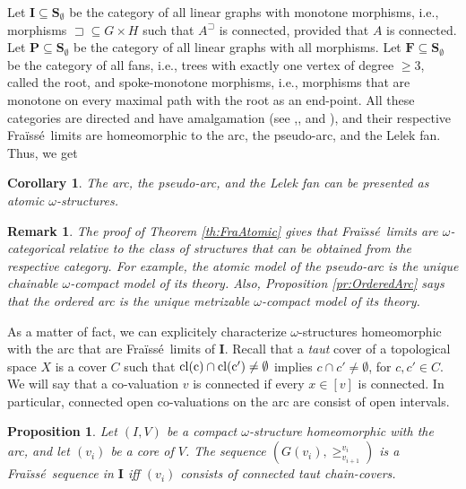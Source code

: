 \documentclass[12pt]{amsart}
\theoremstyle{plain}
\newtheorem{corollary}[theorem]{\bf Corollary}
\newtheorem{remark}[theorem]{\bf Remark}
\newtheorem{proposition}[theorem]{\bf Proposition}
\newcommand \sqsp{\sqsupset}
\newcommand {\cl}[1]{{\rm{cl}(#1)}}
\newcommand \fra{Fra\"{i}ss\'{e}}
\newcommand \FFf{\mathbf{F}}
\newcommand \IIf{\mathbf{I}}
\newcommand \PPf{\mathbf{P}}
\newcommand \SSf{\mathbf{S}}
\begin{document}
Let $\IIf \subseteq \SSf_\emptyset$ be the category of all linear  graphs with monotone morphisms, i.e., morphisms $\sqsp \subseteq G \times H$ such that $A^\sqsp$ is connected, provided that $A$ is connected. Let $\PPf \subseteq \SSf_\emptyset$ be the category of all linear graphs with all morphisms. Let $\FFf \subseteq \SSf_\emptyset$ be the category of all fans, i.e., trees with exactly one vertex of degree $\geq 3$, called the root, and spoke-monotone morphisms, i.e., morphisms that are monotone on every maximal path with the root as an end-point.  All these categories are directed and have amalgamation (see \cite[Proposition 5.13]{BaBiVi2},\cite[Theorem 4.14]{BiMa}, and  \cite[Proposition 5.29]{BaBiVi2}), and their respective \fra \  limits are homeomorphic to the arc, the pseudo-arc, and the Lelek fan. Thus, we get
 
\begin{corollary}
The arc, the pseudo-arc, and the Lelek fan can be presented as atomic $\omega$-structures.
\end{corollary}

\begin{remark}
The proof of Theorem \ref{th:FraAtomic} gives that \fra \ limits are $\omega$-categorical relative to the class of structures that can be obtained from the respective category. For example, the atomic model of the pseudo-arc is the unique chainable $\omega$-compact model of its theory. Also, Proposition \ref{pr:OrderedArc} says that the ordered arc is the unique metrizable $\omega$-compact model of its theory.
\end{remark}

As a matter of fact, we can explicitely characterize $\omega$-structures homeomorphic with the arc that are  \fra \  limits of $\IIf$.  Recall that a \emph{taut} cover of a topological space $X$ is a cover $C$ such that  $\cl{c} \cap \cl{c'} \neq \emptyset$ implies $c \cap c' \neq \emptyset$, for $c,c' \in C$. We will say that a co-valuation $v$ is connected if every $x \in [v]$ is connected. In particular, connected open co-valuations on the arc are consist of open intervals. 
%


\begin{proposition}
\label{pr:ExcAreFra}
Let $(I,V)$ be a compact $\omega$-structure homeomorphic with the arc, and let $(v_i)$ be a core of $V$. The sequence $(G(v_i), \geq^{v_i}_{v_{i+1}})$ is a \fra \  sequence in $\IIf$ iff $(v_i)$ consists of connected taut chain-covers.
\end{proposition}
\end{document}
